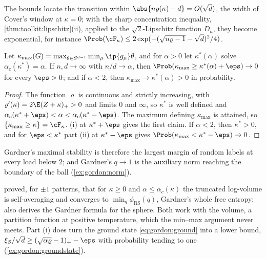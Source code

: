 \begin{refsection}
The bounds locate the transition within $\abs{n\varrho(\kappa)-d}=O(\sqrt d)$, the width of Cover's window at $\kappa=0$; with the sharp concentration inequality, \cref{thm:toolkit:lipschitz}(ii), applied to the $\sqrt2$-Lipschitz function $D_\kappa$, they become exponential, for instance $\Prob(\cF_\kappa)\le2\exp(-(\sqrt{n\varrho-1}-\sqrt d)^2/4)$.

\begin{corollary}\label{cor:gordon:margin}
Let $\kappa_{\max}(G)=\max_{\theta\in S^{d-1}}\min_\mu\ip{g_\mu}\theta$, and for $\alpha>0$ let $\kappa^*(\alpha)$ solve $\alpha_c(\kappa^*)=\alpha$. If $n,d\to\infty$ with $n/d\to\alpha$, then $\Prob(\kappa_{\max}\ge\kappa^*(\alpha)+\eps)\to0$ for every $\eps>0$; and if $\alpha<2$, then $\kappa_{\max}\to\kappa^*(\alpha)>0$ in probability.
\end{corollary}

\begin{proof}
The function $\varrho$ is continuous and strictly increasing, with $\varrho'(\kappa)=2\E(Z+\kappa)_+>0$ and limits $0$ and $\infty$, so $\kappa^*$ is well defined and $\alpha_c(\kappa^*+\eps)<\alpha<\alpha_c(\kappa^*-\eps)$. The maximum defining $\kappa_{\max}$ is attained, so $\{\kappa_{\max}\ge\kappa\}=\cF_\kappa$. (i) at $\kappa^*+\eps$ gives the first claim. If $\alpha<2$, then $\kappa^*>0$, and for $\eps<\kappa^*$ part (ii) at $\kappa^*-\eps$ gives $\Prob(\kappa_{\max}<\kappa^*-\eps)\to0$.
\end{proof}

Gardner's maximal stability is therefore the largest margin of random labels at every load below $2$; and Gardner's $q\to1$ is the auxiliary norm reaching the boundary of the ball (\cref{ex:gordon:norm}).

\begin{remark}\label{rem:gordon:volume}
\Textcite[Theorem~3]{ShcherbinaTirozzi2003} proved, for $\pm1$ patterns, that for $\kappa\ge0$ and $\alpha\le\alpha_c(\kappa)$ the truncated log-volume is self-averaging and converges to $\min_q\phi_{\mathrm{RS}}(q)$, Gardner's whole free entropy; \textcite[Chapter~8]{Talagrand2011b} also derives the Gardner formula for the sphere. Both work with the volume, a partition function at positive temperature, which the min--max argument never meets. Part (i) does turn the ground state \eqref{eq:gordon:ground} into a lower bound, $\xi_S/\sqrt d\ge(\sqrt{\alpha\varrho}-1)_+-\eps$ with probability tending to one (\cref{ex:gordon:groundstate}).
\end{remark}


\end{refsection}
